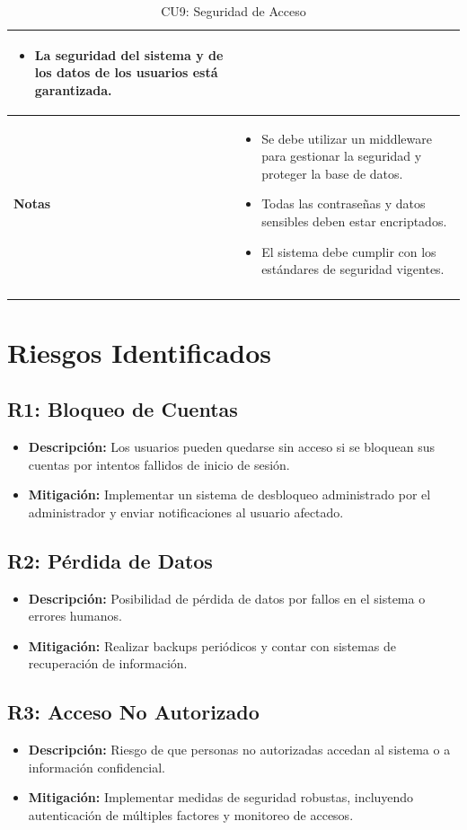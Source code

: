 \documentclass{article}
\begin{document}
\begin{longtable}{|l|p{10cm}|}
\begin{itemize}
    \item La seguridad del sistema y de los datos de los usuarios está garantizada.
\end{itemize} \\ \hline
\textbf{Notas} & 
\begin{itemize}
    \item Se debe utilizar un middleware para gestionar la seguridad y proteger la base de datos.
    \item Todas las contraseñas y datos sensibles deben estar encriptados.
    \item El sistema debe cumplir con los estándares de seguridad vigentes.
\end{itemize} \\ \hline
\caption{CU9: Seguridad de Acceso}
\end{longtable}

\newpage
\section{Riesgos Identificados}

\subsection{R1: Bloqueo de Cuentas}
\begin{itemize}
    \item \textbf{Descripción:} Los usuarios pueden quedarse sin acceso si se bloquean sus cuentas por intentos fallidos de inicio de sesión.
    \item \textbf{Mitigación:} Implementar un sistema de desbloqueo administrado por el administrador y enviar notificaciones al usuario afectado.
\end{itemize}

\subsection{R2: Pérdida de Datos}
\begin{itemize}
    \item \textbf{Descripción:} Posibilidad de pérdida de datos por fallos en el sistema o errores humanos.
    \item \textbf{Mitigación:} Realizar backups periódicos y contar con sistemas de recuperación de información.
\end{itemize}

\subsection{R3: Acceso No Autorizado}
\begin{itemize}
    \item \textbf{Descripción:} Riesgo de que personas no autorizadas accedan al sistema o a información confidencial.
    \item \textbf{Mitigación:} Implementar medidas de seguridad robustas, incluyendo autenticación de múltiples factores y monitoreo de accesos.
\end{itemize}
\end{document}
